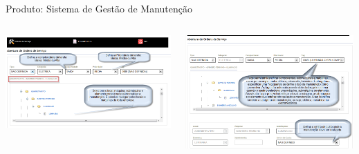 \begin{frame}{Produto: Sistema de Gestão de Manutenção}
	\begin{columns}
		\begin{column}{0.45\textwidth}
			\includegraphics[width=1\textwidth]{imagens/sgm-05}
		\end{column}
		\begin{column}{0.45\textwidth}
			\includegraphics[width=1\textwidth]{imagens/sgm-06}
		\end{column}
	\end{columns}
	
	\framebreak
		

\end{frame}

